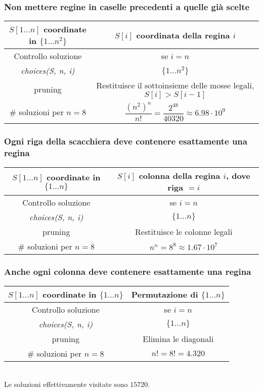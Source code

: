 \subsubsection{Non mettere regine in caselle precedenti a quelle gi\`a scelte}
\begin{tabular}{|c|c|}
	\hline
	$S[1\dots n]$ coordinate in $\{1\dots n^2\}$ & $S[i]$ coordinata della regina $i$\\
	\hline
	Controllo soluzione & se $i = n$ \\
	\hline
	\emph{choices(S, n, i)} & $\{1\dots n^2\}$\\
	\hline
	pruning & \makecell{Restituisce il sottoinsieme\\ delle mosse legali, $S[i]>S[i-1]$}\\
	\hline
	$\#$ soluzioni per $n=8$ & $\dfrac{(n^2)^n}{n!} = \dfrac{2^{48}}{40320}\approx 6.98\cdot 10^{9}$\\
	\hline
\end{tabular}
\subsubsection{Ogni riga della scacchiera deve contenere esattamente una regina}
\begin{tabular}{|c|c|}
	\hline
	$S[1\dots n]$ coordinate in $\{1\dots n\}$ & $S[i]$ colonna della regina $i$, dove riga $= i$\\
	\hline
	Controllo soluzione & se $i = n$ \\
	\hline
	\emph{choices(S, n, i)} & $\{1\dots n\}$\\
	\hline
	pruning & Restituisce le colonne legali\\
	\hline
	$\#$ soluzioni per $n=8$ & $n^n = 8^8\approx 1.67\cdot 10^{7}$\\
	\hline
\end{tabular}
\subsubsection{Anche ogni colonna deve contenere esattamente una regina}
\begin{tabular}{|c|c|}
	\hline
	$S[1\dots n]$ coordinate in $\{1\dots n\}$ & Permutazione di $\{1\dots n\}$\\
	\hline
	Controllo soluzione & se $i = n$ \\
	\hline
	\emph{choices(S, n, i)} & $\{1\dots n\}$\\
	\hline
	pruning & Elimina le diagonali\\
	\hline
	$\#$ soluzioni per $n=8$ & $n! = 8! = 4.320$\\
	\hline
\end{tabular}\\
Le soluzioni effettivamente visitate sono $15720$.
